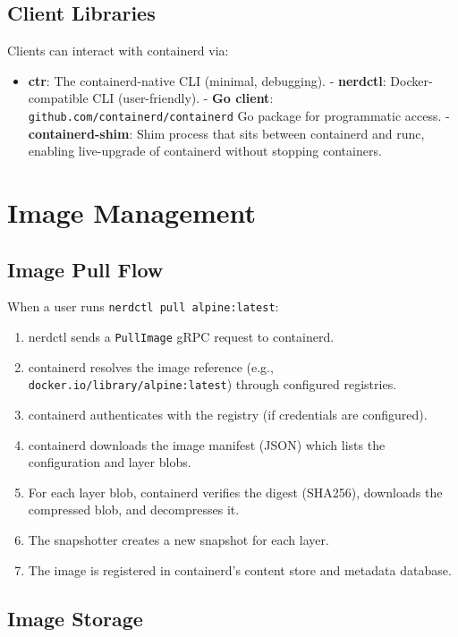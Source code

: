 \subsection{Client Libraries}

Clients can interact with containerd via:
\begin{itemize}[nosep]
  \item \textbf{ctr}: The containerd-native CLI (minimal, debugging).
  - \textbf{nerdctl}: Docker-compatible CLI (user-friendly).
  - \textbf{Go client}: \texttt{github.com/containerd/containerd} Go
        package for programmatic access.
  - \textbf{containerd-shim}: Shim process that sits between containerd
        and runc, enabling live-upgrade of containerd without stopping
        containers.
\end{itemize}

\section{Image Management}

\subsection{Image Pull Flow}

When a user runs \texttt{nerdctl pull alpine:latest}:

\begin{enumerate}[nosep]
  \item nerdctl sends a \texttt{PullImage} gRPC request to containerd.
  \item containerd resolves the image reference (e.g.,
        \texttt{docker.io/library/alpine:latest}) through configured
        registries.
  \item containerd authenticates with the registry (if credentials are
        configured).
  \item containerd downloads the image manifest (JSON) which lists the
        configuration and layer blobs.
  \item For each layer blob, containerd verifies the digest (SHA256),
        downloads the compressed blob, and decompresses it.
  \item The snapshotter creates a new snapshot for each layer.
  \item The image is registered in containerd's content store and
        metadata database.
\end{enumerate}

\subsection{Image Storage}

